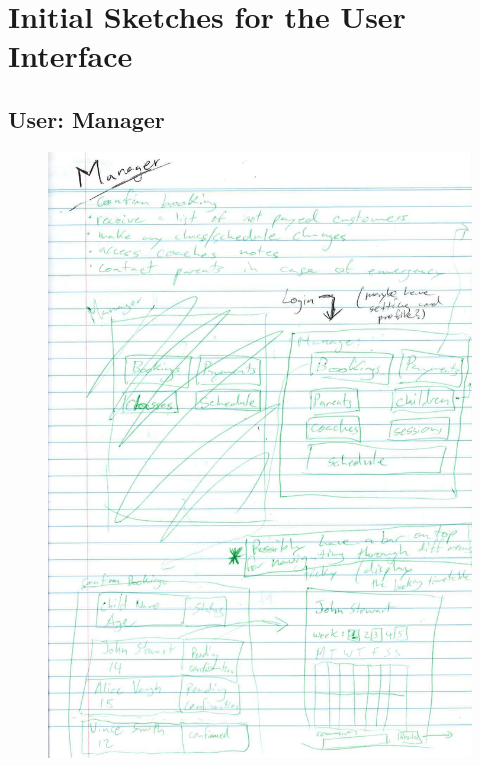 \documentclass{l3proj}
\begin{document}
\pagebreak
\section{Initial Sketches for the User Interface}
\subsection{User: Manager}

{
\begin{figure}[h]
\centering
\includegraphics[scale=0.50]{0085_001-page-005.jpg}
\end{figure}
}
\end{document}

